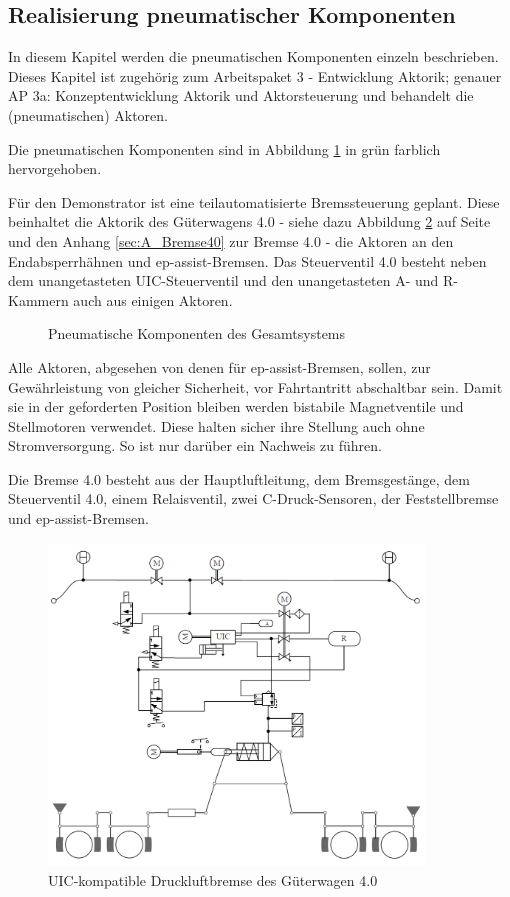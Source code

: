 \subsection{Realisierung pneumatischer Komponenten} \label{sec:pKomp}
In diesem Kapitel werden die pneumatischen Komponenten einzeln beschrieben. Dieses Kapitel ist zugehörig zum Arbeitspaket 3 - Entwicklung Aktorik; genauer AP 3a: Konzeptentwicklung Aktorik und Aktorsteuerung und behandelt die (pneumatischen) Aktoren.\par
Die pneumatischen Komponenten sind in Abbildung \ref{fig:pKomp} in grün farblich hervorgehoben.\par
Für den Demonstrator ist eine teilautomatisierte Bremssteuerung geplant. Diese beinhaltet die Aktorik des Güterwagens 4.0 - siehe dazu Abbildung \ref{fig:UIC-Bremse} auf Seite \pageref{fig:UIC-Bremse} und den Anhang \ref{sec:A_Bremse40} zur Bremse 4.0 - die Aktoren an den Endabsperrhähnen und \gls{ep-assist-Bremsen}. Das Steuerventil 4.0 besteht neben dem unangetasteten UIC-Steuerventil und den unangetasteten A- und R-Kammern auch aus einigen Aktoren.\par
\begin{figure}[hbt]
    \centering
    
    \caption{Pneumatische Komponenten des Gesamtsystems}
    \label{fig:pKomp}
\end{figure}
Alle Aktoren, abgesehen von denen für \gls{ep-assist-Bremsen}, sollen, zur Gewährleistung von gleicher Sicherheit, vor Fahrtantritt abschaltbar sein. Damit sie in der geforderten Position bleiben werden bistabile Magnetventile und Stellmotoren verwendet. Diese halten sicher ihre Stellung auch ohne Stromversorgung. So ist nur darüber ein Nachweis zu führen.\par
Die Bremse 4.0 besteht aus der Hauptluftleitung, dem Bremsgestänge, dem Steuerventil 4.0, einem Relaisventil, zwei C-Druck-Sensoren, der Feststellbremse und \gls{ep-assist-Bremsen}.\par
\begin{figure}
    \centering%
    \includegraphics[width=10cm]{Bilder/GW40Schema.PNG}
    \caption{UIC-kompatible Druckluftbremse des Güterwagen 4.0}%
    \label{fig:UIC-Bremse}
\end{figure}
